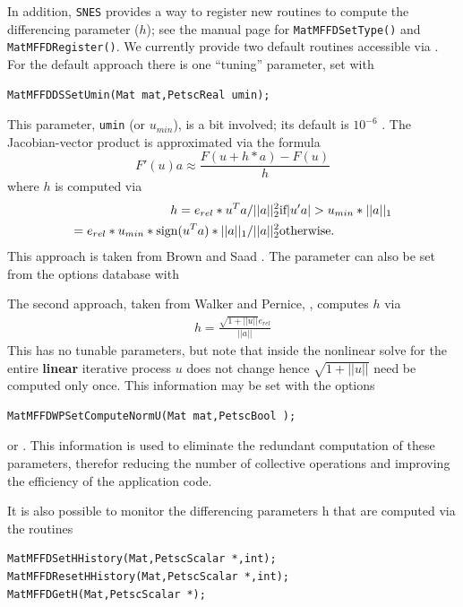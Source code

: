 In addition, \lstinline{SNES} provides a way to register new routines to compute the differencing parameter ($h$);
see the manual page for \lstinline{MatMFFDSetType()} and \lstinline{MatMFFDRegister()}. We currently provide two default routines accessible via
.
For the default approach there is one ``tuning'' parameter, set with
\begin{lstlisting}
MatMFFDDSSetUmin(Mat mat,PetscReal umin);
\end{lstlisting}
This parameter, \lstinline{umin} (or $u_{min}$), is a bit involved; its default is
$ 10^{-6} $ . The Jacobian-vector product is approximated via the formula
\[
    F'(u) a \approx \frac{F(u + h*a) - F(u)}{h}
\]
where $ h $ is computed via
\begin{eqnarray*}
h = e_{rel}*u^{T}a/||a||^2_2                                 & \hbox{if}  |u'a| > u_{min}*||a||_{1} \\
  = e_{rel}*u_{min}*\text{sign}(u^{T}a)*||a||_{1}/||a||^2_2  & \hbox{otherwise}.
\end{eqnarray*}
This approach is taken from Brown and Saad \cite{brownsaad:90}.
The parameter can also be set from the options database with

The second approach, taken from Walker and Pernice, \cite{pw98}, computes $ h $ via
\begin{eqnarray*}
        h = \frac{\sqrt{1 + ||u||}e_{rel}}{||a||}
\end{eqnarray*}
This has no tunable parameters, but note that inside the nonlinear solve for
the entire {\bf linear} iterative process $ u $ does not change hence
$\sqrt{1 + ||u||} $ need be computed only once. This information may be set with the
options
\begin{lstlisting}
MatMFFDWPSetComputeNormU(Mat mat,PetscBool );
\end{lstlisting}
or .
This information is used to eliminate the redundant computation of these parameters,
therefor reducing the number of collective operations and improving the efficiency of the
         application code.

It is also possible to monitor the differencing parameters h that are computed
via the routines
\begin{lstlisting}
MatMFFDSetHHistory(Mat,PetscScalar *,int);
MatMFFDResetHHistory(Mat,PetscScalar *,int);
MatMFFDGetH(Mat,PetscScalar *);
\end{lstlisting}

